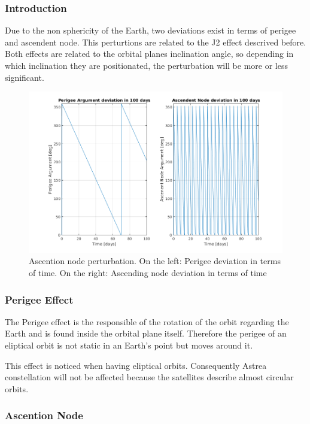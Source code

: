 \subsubsection{Introduction}

Due to the non sphericity of the Earth, two deviations exist in terms of perigee and ascendent node. This perturtions are related to the J2 effect descrived before.
Both effects are related to the orbital planes inclination angle, so depending in which inclination they are positionated, the perturbation will be more or less  significant.

\begin{figure}[H] %
	\centering
	\includegraphics[width=.8\textwidth]{./decay/Inclination.png}
	\caption{Ascention node perturbation. On the left: Perigee deviation in terms of time. On the right: Ascending node deviation in terms of time}
	\label{fig:Inclination} 
\end{figure}

\subsubsection{Perigee Effect}
The Perigee effect is the responsible of the rotation of the orbit regarding the Earth and is found inside the orbital plane itself. Therefore the perigee of an eliptical orbit is not static in an Earth's point but moves around it. 

This effect is noticed when having eliptical orbits. Consequently Astrea constellation will not be affected because the satellites describe almost circular orbits.

\subsubsection{Ascention Node}

